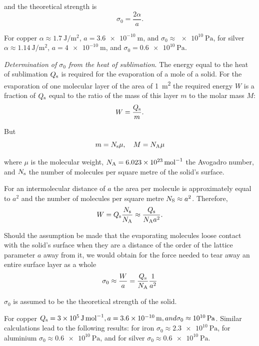\noindent
and the theoretical strength is
\begin{equation}\label{eq:2_18}
	\sigma_0 = \frac{2 \alpha}{a}.
\end{equation}

\noindent
For copper $\alpha\approx\SI{1.7}{\joule\per\metre\squared}$, $a=\SI{3.6e-10}{\metre}$, and $\sigma_0\approx\SI{e10}{\pascal}$, for silver $\alpha\approx\SI{1.14}{\joule\per\metre\squared}$, $a=\SI{4e-10}{\metre}$, and $\sigma_0=\SI{0.6e10}{\pascal}$.

\textit{Determination of $\sigma_0$ from the heat of sublimation}. The energy equal to the heat of sublimation $Q_{\text{s}}$ is required for the evaporation of a mole of a solid. For the evaporation of one molecular layer of the area of \SI{1}{\metre\squared} the required energy $W$ is a fraction of $Q_{\text{s}}$ equal to the ratio of the mass of this layer $m$ to the molar mass $M$:
\begin{equation*}
	W = \frac{Q_{\text{s}}}{m}.
\end{equation*}

\noindent
But
\begin{equation*}
	m = N_{\text{s}} \mu,\quad M = N_{\text{A}} \mu
\end{equation*}

\noindent
where $\mu$ is the molecular weight, $N_{\text{A}}=\SI{6.023e23}{\per\mole}$ the Avogadro number, and $N_{\text{s}}$ the number of molecules per square metre of the solid's surface.

For an intermolecular distance of $a$ the area per molecule is approximately equal to $a^2$ and the number of molecules per square metre
$N_{\text{S}}\approx a^2$. Therefore,
\begin{equation*}
	W = Q_{\text{s}} \frac{N_{\text{s}}}{N_{\text{A}}} \approx \frac{Q_{\text{s}}}{N_{\text{A}} a^2}.
\end{equation*}

Should the assumption be made that the evaporating molecules loose contact with the solid's surface when they are a distance of the order of the lattice parameter $a$ away from it, we would obtain for the force needed to tear away an entire surface layer as a whole
\begin{equation}\label{eq:2_19}
	\sigma_0 \approx \frac{W}{a} = \frac{Q_{\text{s}}}{N_{\text{A}}} \frac{1}{a^2}
\end{equation}

\noindent
$\sigma_0$ is assumed to be the theoretical strength of the solid.

For copper $Q_{\text{s}}=\SI{3e5}{\joule\per\mole}, a=\SI{3.6e-10}{\metre}, and \sigma_0\approx\SI{e10}{\pascal}$. Similar calculations lead to the following results: for iron $\sigma_0\approx\SI{2.3e10}{\pascal}$, for aluminium $\sigma_0\approx\SI{0.6e10}{\pascal}$, and for silver $\sigma_0\approx\SI{0.6e10}{\pascal}$.

